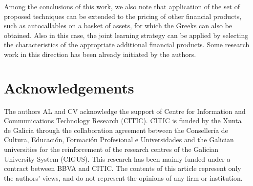     Among the conclusions of this work, we also note that application of the set of proposed techniques can be extended to the pricing of other financial products, such as autocallables on a basket of assets, for which the Greeks can also be obtained. Also in this case, the joint learning strategy can be applied by selecting the characteristics of the appropriate additional financial products. Some research work in this direction has been already initiated by the authors.


\section*{Acknowledgements}

    The authors AL and CV acknowledge the support of Centre for Information and Communications Technology Research (CITIC). CITIC is funded by the Xunta de Galicia through the collaboration agreement between the Consellería de Cultura, Educación, Formación Profesional e Universidades and the Galician universities for the reinforcement of the research centres of the Galician University System (CIGUS). This research has been mainly funded under a contract between BBVA and CITIC. The contents of this article represent only the authors’ views, and do not represent the opinions of any firm or institution.










    




